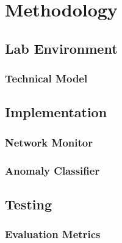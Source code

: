 \chapter{Methodology}
\label{chap:methodology}


\section{Lab Environment}
\label{sec:environment}


\subsection{Technical Model}
\label{subsec:technical-model}


\section{Implementation}
\label{sec:implemntation}


\subsection{Network Monitor}
\label{subsec:monitor-implementation}


\subsection{Anomaly Classifier}
\label{subsec:classifier-implementation}


\section{Testing}
\label{sec:testing}


\subsection{Evaluation Metrics}
\label{subsec:evaluation-metrics}
